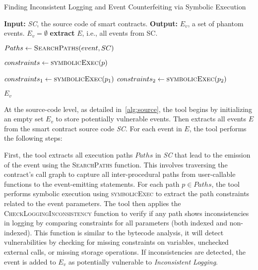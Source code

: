 \begin{algorithm}
\footnotesize
  \caption{Finding Inconsistent Logging and Event Counterfeiting via Symbolic Execution}\label{alg:source}
  \begin{algorithmic}[1]
    \Statex \textbf{Input:} \textit{SC}, the source code of smart contracts.
    \Statex \textbf{Output:} $E_v$, a set of phantom events.
      \State $E_v = \emptyset$
      \State \textbf{extract} $E$, i.e., all events from SC. \label{source:event}

        \State $Paths \gets \textsc{SearchPaths}({event, SC})$ 

          \State $constraints \gets \textsc{symbolicExec}({p})$
          \EndIf
        \EndFor

          \State $constraints_1 \gets \textsc{symbolicExec}({p_1})$
          \State $constraints_2 \gets \textsc{symbolicExec}({p_2})$

          \EndIf
        \EndFor
      \EndFor

      \State \Return $E_v$

  \end{algorithmic}
\end{algorithm}

At the source-code level, as detailed in~\cref{alg:source}, the tool begins by initializing an empty set \(E_v\) to store potentially vulnerable events. Then extracts all events \(E\) from the smart contract source code \textit{SC}. For each event in \(E\), the tool performs the following steps:

First, the tool extracts all execution paths \(Paths\) in \textit{SC} that lead to the emission of the event using the \textsc{SearchPaths} function. This involves traversing the contract's call graph to capture all inter-procedural paths from user-callable functions to the event-emitting statements. For each path \(p \in Paths\), the tool performs symbolic execution using \textsc{symbolicExec} to extract the path constraints related to the event parameters. The tool then applies the \textsc{CheckLoggingInconsistency} function to verify if any path shows inconsistencies in logging by comparing constraints for all parameters (both indexed and non-indexed). This function is similar to the bytecode analysis, it will detect vulnerabilities by checking for missing constraints on variables, unchecked external calls, or missing storage operations. If inconsistencies are detected, the event is added to \(E_v\) as potentially vulnerable to \emph{Inconsistent Logging}.


